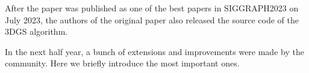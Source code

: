 After the paper was published as one of the best papers in SIGGRAPH2023 on July 2023, 
the authors of the original paper also released the source code of the 3DGS algorithm. 

In the next half year, a bunch of extensions and improvements were made by the community. 
Here we briefly introduce the most important ones.